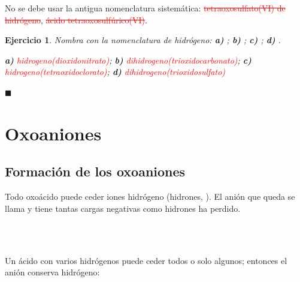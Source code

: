 \documentclass[12pt]{article}
\theoremstyle{mygreennumbox}
\newtheorem{ejercicioT}{Ejercicio}[section]
\newenvironment{exercise}{\begin{eBoxmygreen}\begin{ejercicioT}}{\hfill{\color{mygreen}\tiny\ensuremath{\blacksquare}}\end{ejercicioT}\end{eBoxmygreen}}
\newcommand{\mal}[1]{\textcolor{red}{\sout{#1}}}
\newcommand{\ampliacion}{\texorpdfstring{\tcbox[on line, colback=myOrange3!12, colframe=myOrange3, boxrule=0.6pt, arc=2pt, boxsep=0pt, left=3pt, right=3pt, top=1pt, bottom=1pt]{\footnotesize\sffamily\bfseries\textcolor{myOrange3}{\faRocket\ Ampliación}}}{(Ampliación)}}
\begin{document}
\begin{marker}
    No se debe usar la antigua nomenclatura sistemática: \mal{tetraoxosulfato(VI) de hidrógeno}, \mal{ácido tetraoxosulfúrico(VI)}.
\end{marker}

\begin{exercise}
    \ampliacion\par
    Nombra con la nomenclatura de hidrógeno: \textbf{a)} ; \textbf{b)} ; \textbf{c)} ; \textbf{d)} .
    \begin{solu}
        \textbf{a)} \textcolor{red}{hidrogeno(dioxidonitrato)}; \textbf{b)} \textcolor{red}{dihidrogeno(trioxidocarbonato)}; \textbf{c)} \textcolor{red}{hidrogeno(tetraoxidoclorato)}; \textbf{d)} \textcolor{red}{dihidrogeno(trioxidosulfato)}
    \end{solu}
\end{exercise}

\section{Oxoaniones}\label{sec:oxoaniones}

\subsection{Formación de los oxoaniones}

Todo oxoácido puede ceder iones hidrógeno (hidrones, ). El anión que queda se llama  y tiene tantas cargas negativas como hidrones ha perdido.

\begin{center}
    \\
    \\
\end{center}

Un ácido con varios hidrógenos puede ceder todos o solo algunos; entonces el anión conserva hidrógeno:
\begin{center}
    \\
    \\
    \\
\end{center}
\end{document}
